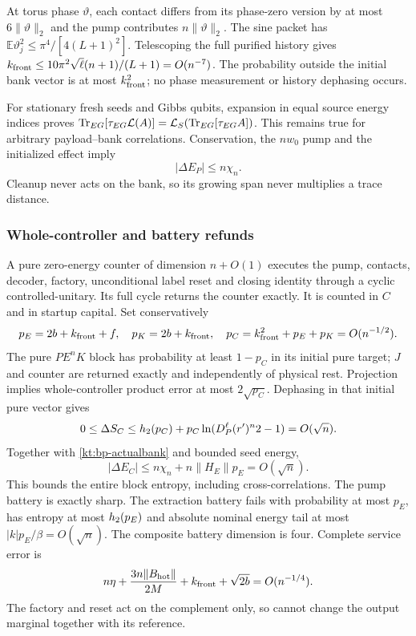 At torus phase $\vartheta$, each contact differs from its phase-zero
version by at most $6\|\vartheta\|_2$ and the pump contributes
$n\|\vartheta\|_2$. The sine packet has
$\mathbb E\vartheta_j^2\le\pi^4/[4(L+1)^2]$. Telescoping the full
purified history gives
$k_{\rm front}\le10\pi^2\sqrt\ell(n+1)/(L+1)=O(n^{-7})$.
The probability outside the initial bank vector is at most
$k_{\rm front}^2$; no phase measurement or history dephasing occurs.

For stationary fresh seeds and Gibbs qubits, expansion in equal
source energy indices proves
$\operatorname{Tr}_{EG}[\tau_{EG}\mathcal L(A)]
=\mathcal L_S(\operatorname{Tr}_{EG}[\tau_{EG}A])$.
This remains true for arbitrary payload--bank correlations.
Conservation, the $nw_0$ pump and the initialized effect imply
\begin{equation}\label{kt:bp-actualbank}
 |\Delta E_P|\le n\chi_n.
\end{equation}
Cleanup never acts on the bank, so its growing span never multiplies
a trace distance.

\subsubsection{Whole-controller and battery refunds}
A pure zero-energy counter of dimension $n+O(1)$ executes the pump,
contacts, decoder, factory, unconditional label reset and closing
identity through a cyclic controlled-unitary. Its full cycle returns
the counter exactly. It is counted in $C$ and in startup capital.
Set conservatively
\[
 p_E=2b+k_{\rm front}+f,\quad p_K=2b+k_{\rm front},\quad
 p_C=k_{\rm front}^2+p_E+p_K=O(n^{-1/2}).
\]
The pure $PE^nK$ block has probability at least $1-p_C$ in its initial
pure target; $J$ and counter are returned exactly and independently
of physical rest. Projection implies whole-controller product error
at most $2\sqrt{p_C}$. Dephasing in that initial pure vector gives
\[
 0\le\Delta S_C\le h_2(p_C)+p_C\ln(D_P^\ell(r')^n2-1)=O(\sqrt n).
\]
Together with \eqref{kt:bp-actualbank} and bounded seed energy,
\[
 |\Delta E_C|\le n\chi_n+n\|H_E\|p_E=O(\sqrt n).
\]
This bounds the entire block entropy, including cross-correlations.
The pump battery is exactly sharp. The extraction battery fails
with probability at most $p_E$, has entropy at most $h_2(p_E)$ and
absolute nominal energy tail at most $|k|p_E/\beta=O(\sqrt n)$.
The composite battery dimension is four. Complete service error is
\[
 n\eta+\frac{3n\|B_{\rm hot}\|}{2M}
               +k_{\rm front}+\sqrt{2b}=O(n^{-1/4}).
\]
The factory and reset act on the complement only, so cannot change
the output marginal together with its reference.

